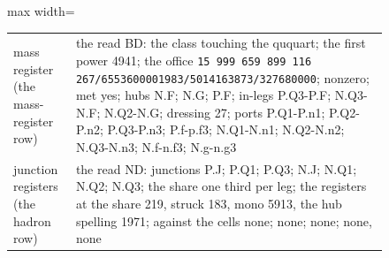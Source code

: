 \begin{figure}[H]
\begin{center}
\begin{adjustbox}{max width=\linewidth}
\begin{tabular}{p{}p{}}
mass register (the mass-register row) & the read BD: the class touching the ququart; the first power 4941; the office \texttt{15 999 659 899 116 267/655360000\textbar{}1983/50\textbar{}14163873/32768000\textbar{}0}; nonzero; met yes; hubs N.F; N.G; P.F; in-legs P.Q3-P.F; N.Q3-N.F; N.Q2-N.G; dressing 27; ports P.Q1-P.n1; P.Q2-P.n2; P.Q3-P.n3; P.f-p.f3; N.Q1-N.n1; N.Q2-N.n2; N.Q3-N.n3; N.f-n.f3; N.g-n.g3 \\
junction registers (the hadron row) & the read ND: junctions P.J; P.Q1; P.Q3; N.J; N.Q1; N.Q2; N.Q3; the share one third per leg; the registers at the share 219, struck 183, mono 5913, the hub spelling 1971; against the cells none; none; none; none, none \\
\bottomrule\end{tabular}\end{adjustbox}\end{center}
\end{figure}
